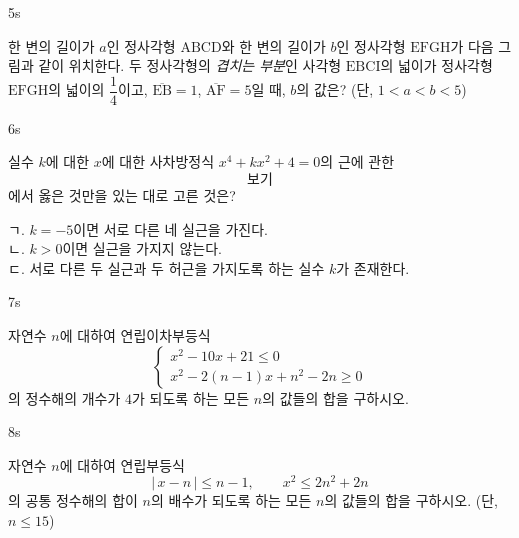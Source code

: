\documentclass[10pt]{article}
\begin{document}
\begin{pagepair}

\begin{problem}{5}{s}
\par\smallskip
한 변의 길이가 $a$인 정사각형 $\mathrm{ABCD}$와 한 변의 길이가 $b$인 정사각형 $\mathrm{EFGH}$가 다음 그림과 같이 위치한다. 두 정사각형의 \emph{겹치는 부분}인 사각형 $\mathrm{EBCI}$의 넓이가 정사각형 $\mathrm{EFGH}$의 넓이의 $\dfrac{1}{4}$이고, $\overline{\mathrm{EB}} = 1$, $\overline{\mathrm{AF}} = 5$일 때, $b$의 값은? (단, $1 < a < b < 5$)
\begin{center}
\end{center}
\begin{choices}
\end{choices}
\end{problem}

\begin{problem}{6}{s}
\par\smallskip
실수 $k$에 대한 $x$에 대한 사차방정식 $x^4 + kx^2 + 4 = 0$의 근에 관한 \[보기\]에서 옳은 것만을 있는 대로 고른 것은?
\begin{conditions}
ㄱ. $k = -5$이면 서로 다른 네 실근을 가진다. \\
ㄴ. $k > 0$이면 실근을 가지지 않는다. \\
ㄷ. 서로 다른 두 실근과 두 허근을 가지도록 하는 실수 $k$가 존재한다.
\end{conditions}
\begin{choices}
\end{choices}
\end{problem}

\end{pagepair}


\begin{pagepair}

\begin{problem}{7}{s}
\par\smallskip
자연수 $n$에 대하여 연립이차부등식
$$\begin{cases} x^2 - 10x + 21 \le 0 \\ x^2 - 2(n - 1)x + n^2 - 2n \ge 0 \end{cases}$$
의 정수해의 개수가 $4$가 되도록 하는 모든 $n$의 값들의 합을 구하시오.
\end{problem}

\begin{problem}{8}{s}
\par\smallskip
자연수 $n$에 대하여 연립부등식
$$|\,x - n\,| \le n - 1, \qquad x^2 \le 2n^2 + 2n$$
의 공통 정수해의 합이 $n$의 배수가 되도록 하는 모든 $n$의 값들의 합을 구하시오. (단, $n \le 15$)
\end{problem}

\end{pagepair}
\end{document}
